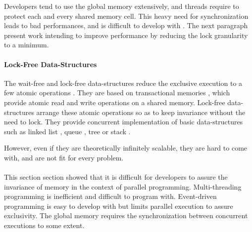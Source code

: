 
Developers tend to use the global memory extensively, and threads require to protect each and every shared memory cell.
This heavy need for synchronization leads to bad performances, and is difficult to develop with \cite{Adya2002}.
The next paragraph present work intending to improve performance by reducing the lock granularity to a minimum.

\paragraph{Lock-Free Data-Structures}

The wait-free and lock-free data-structures reduce the exclusive execution to a few atomic operations \cite{Lamport1977,Herlihy1988,Herlihy1990,Herlihy1991,Anderson1990}.
They are based on transactional memories \cite{Harris2010}, which provide atomic read and write operations on a shared memory.
Lock-free data-structures arrange these atomic operations so as to keep invariance without the need to lock.
They provide concurrent implementation of basic data-structures such as linked list \cite{Valois1995,Timnat2012}, queue \cite{Sundell2003,Wimmer2015}, tree \cite{Ramachandran2015} or stack \cite{Hendler2004}.

However, even if they are theoretically infinitely scalable, they are hard to come with, and are not fit for every problem.




\paragraph{}

This section section showed that it is difficult for developers to assure the invariance of memory in the context of parallel programming.
Multi-threading programming is inefficient and difficult to program with.
Event-driven programming is easy to develop with but limits parallel execution to assure exclusivity.
The global memory requires the synchronization between concurrent executions to some extent.

